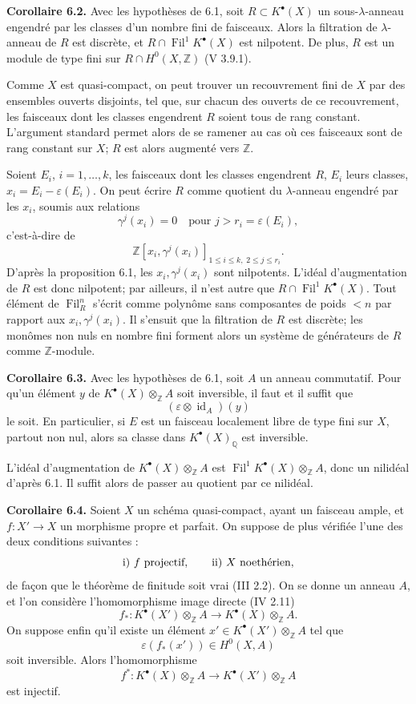 \documentclass[11pt]{article}
\newcommand{\Fil}{\operatorname{Fil}}
\begin{document}
\textbf{Corollaire 6.2.} Avec les hypothèses de 6.1, soit \(R\subset K^\bullet(X)\) un sous-\(\lambda\)-anneau engendré par les classes d'un nombre fini de faisceaux. Alors la filtration de \(\lambda\)-anneau de \(R\) est discrète, et \(R\cap\Fil^1K^\bullet(X)\) est nilpotent. De plus, \(R\) est un module de type fini sur \(R\cap H^0(X,\mathbb Z)\) (V 3.9.1).

Comme \(X\) est quasi-compact, on peut trouver un recouvrement fini de \(X\) par des ensembles ouverts disjoints, tel que, sur chacun des ouverts de ce recouvrement, les faisceaux dont les classes engendrent \(R\) soient tous de rang constant. L'argument standard permet alors de se ramener au cas où ces faisceaux sont de rang constant sur \(X\); \(R\) est alors augmenté vers \(\mathbb Z\).

Soient \(E_i\), \(i=1,\ldots,k\), les faisceaux dont les classes engendrent \(R\), \(E_i\) leurs classes, \(x_i=E_i-\varepsilon(E_i)\). On peut écrire \(R\) comme quotient du \(\lambda\)-anneau engendré par les \(x_i\), soumis aux relations
\[
  \gamma^j(x_i)=0\quad\text{pour }j>r_i=\varepsilon(E_i),
\]
c'est-à-dire de
\[
  \mathbb Z[x_i,\gamma^j(x_i)]_{1\leq i\leq k,\;2\leq j\leq r_i}.
\]
D'après la proposition 6.1, les \(x_i,\gamma^j(x_i)\) sont nilpotents. L'idéal d'augmentation de \(R\) est donc nilpotent; par ailleurs, il n'est autre que \(R\cap\Fil^1K^\bullet(X)\). Tout élément de \(\Fil_R^n\) s'écrit comme polynôme sans composantes de poids \(<n\) par rapport aux \(x_i,\gamma^j(x_i)\). Il s'ensuit que la filtration de \(R\) est discrète; les monômes non nuls en nombre fini forment alors un système de générateurs de \(R\) comme \(\mathbb Z\)-module.

\textbf{Corollaire 6.3.} Avec les hypothèses de 6.1, soit \(A\) un anneau commutatif. Pour qu'un élément \(y\) de \(K^\bullet(X)\otimes_{\mathbb Z}A\) soit inversible, il faut et il suffit que
\[
  (\varepsilon\otimes\operatorname{id}_A)(y)
\]
le soit. En particulier, si \(E\) est un faisceau localement libre de type fini sur \(X\), partout non nul, alors sa classe dans \(K^\bullet(X)_{\mathbb Q}\) est inversible.

L'idéal d'augmentation de \(K^\bullet(X)\otimes_{\mathbb Z}A\) est \(\Fil^1K^\bullet(X)\otimes_{\mathbb Z}A\), donc un nilidéal d'après 6.1. Il suffit alors de passer au quotient par ce nilidéal.

\textbf{Corollaire 6.4.} Soient \(X\) un schéma quasi-compact, ayant un faisceau ample, et \(f:X'\to X\) un morphisme propre et parfait. On suppose de plus vérifiée l'une des deux conditions suivantes :
\[
  \text{\rm i) } f\text{ projectif},\qquad
  \text{\rm ii) } X\text{ noethérien},
\]
de façon que le théorème de finitude soit vrai (III 2.2). On se donne un anneau \(A\), et l'on considère l'homomorphisme image directe (IV 2.11)
\[
  f_*:K^\bullet(X')\otimes_{\mathbb Z}A
  \longrightarrow K^\bullet(X)\otimes_{\mathbb Z}A.
\]
On suppose enfin qu'il existe un élément \(x'\in K^\bullet(X')\otimes_{\mathbb Z}A\) tel que
\[
  \varepsilon(f_*(x'))\in H^0(X,A)
\]
soit inversible. Alors l'homomorphisme
\[
  f^*:K^\bullet(X)\otimes_{\mathbb Z}A
  \longrightarrow K^\bullet(X')\otimes_{\mathbb Z}A
\]
est injectif.
\end{document}
